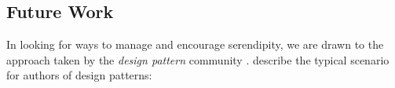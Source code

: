 \subsection{Future Work} \label{sec:futurework} \label{sec:hatching}

In looking for ways to manage and encourage serendipity, we are drawn
to the approach taken by the \emph{design pattern} community
\cite{alexander1999origins}.
 describe the typical scenario for authors of design
patterns: 

